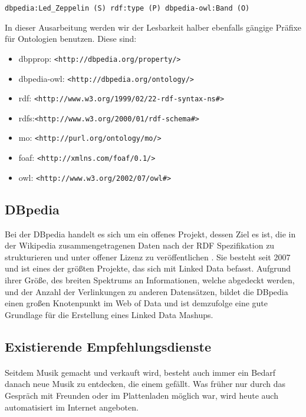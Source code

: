 \begin{lstlisting}
dbpedia:Led_Zeppelin (S) rdf:type (P) dbpedia-owl:Band (O)
\end{lstlisting}

In dieser Ausarbeitung werden wir der Lesbarkeit halber ebenfalls gängige Präfixe für Ontologien benutzen. Diese sind:
\begin{itemize}
\item dbpprop: \tt <http://dbpedia.org/property/>
\item dbpedia-owl: \tt <http://dbpedia.org/ontology/>
\item rdf: \tt <http://www.w3.org/1999/02/22-rdf-syntax-ns\#>
\item rdfs:\tt <http://www.w3.org/2000/01/rdf-schema\#>
\item mo: \tt <http://purl.org/ontology/mo/>
\item foaf: \tt <http://xmlns.com/foaf/0.1/>
\item owl: \tt <http://www.w3.org/2002/07/owl\#>
\end{itemize}

\subsection{DBpedia}

Bei der DBpedia handelt es sich um ein offenes Projekt, dessen Ziel es ist, die in der Wikipedia zusammengetragenen Daten nach der RDF Spezifikation zu strukturieren und unter offener Lizenz zu veröffentlichen \cite{dbpedia_about}. Sie besteht seit 2007 und ist eines der größten Projekte, das sich mit Linked Data befasst. Aufgrund ihrer Größe, des breiten Spektrums an Informationen, welche abgedeckt werden, und der Anzahl der Verlinkungen zu anderen Datensätzen, bildet die DBpedia einen großen Knotenpunkt im Web of Data und ist demzufolge eine gute Grundlage für die Erstellung eines Linked Data Mashups.


\subsection{Existierende Empfehlungsdienste}
\paragraph{} Seitdem Musik gemacht und verkauft wird, besteht auch immer ein Bedarf danach neue Musik zu entdecken, die einem gefällt. Was früher nur durch das Gespräch mit Freunden oder im Plattenladen möglich war, wird heute auch automatisiert im Internet angeboten.


